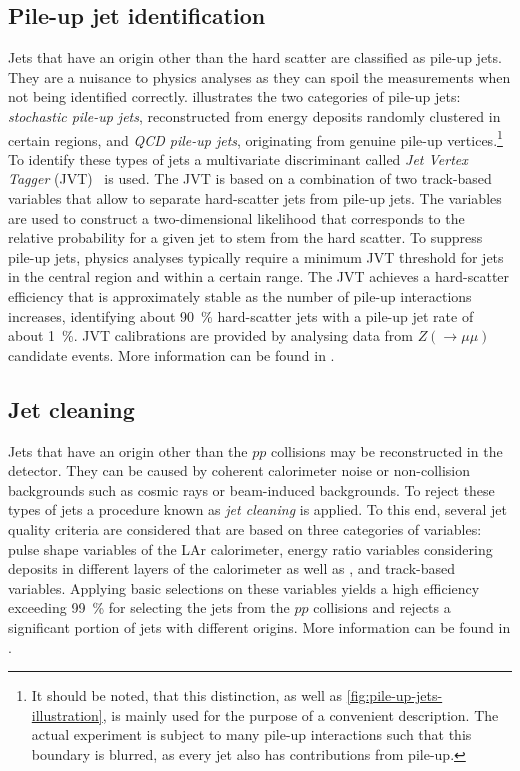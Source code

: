 \subsection{Pile-up jet identification}
Jets that have an origin other than the hard scatter are classified as pile-up jets.
They are a nuisance to physics analyses as they can spoil the measurements when not being identified correctly.
 illustrates the two categories of pile-up jets:
\emph{stochastic pile-up jets}, reconstructed from energy deposits randomly clustered in certain regions, and \emph{QCD pile-up jets}, originating from genuine pile-up vertices.\footnote{It should be noted, that this distinction, as well as \cref{fig:pile-up-jets-illustration}, is mainly used for the purpose of a convenient description. The actual experiment is subject to many pile-up interactions such that this boundary is blurred, as every jet also has contributions from pile-up.}
To identify these types of jets a multivariate discriminant called \emph{Jet Vertex Tagger} (JVT)~\cite{ATLAS-CONF-2014-018} is used.
The JVT is based on a combination of two track-based variables that allow to separate hard-scatter jets from pile-up jets. The variables are used to construct a two-dimensional likelihood that corresponds to the relative probability for a given jet to stem from the hard scatter.
To suppress pile-up jets, physics analyses typically require a minimum JVT threshold for jets in the central region  and within a certain \pT range.
The JVT achieves a hard-scatter efficiency that is approximately stable as the number of pile-up interactions increases, identifying about \SI{90}{\percent} hard-scatter jets with a pile-up jet rate of about \SI{1}{\percent}.
JVT calibrations are provided by analysing data from $Z (\rightarrow \mu\mu)$ candidate events.
More information can be found in .


\subsection{Jet cleaning}
Jets that have an origin other than the $pp$ collisions may be reconstructed in the detector. They can be caused by coherent calorimeter noise or non-collision backgrounds such as cosmic rays or beam-induced backgrounds. To reject these types of jets a procedure known as \emph{jet cleaning} is applied. To this end, several jet quality criteria are considered that are based on three categories of variables: pulse shape variables of the LAr calorimeter, energy ratio variables considering deposits in different layers of the calorimeter as well as \fEM, and track-based variables.
Applying basic selections on these variables yields a high efficiency exceeding \SI{99}{\percent} for selecting the jets from the $pp$ collisions and rejects a significant portion of jets with different origins. More information can be found in .



